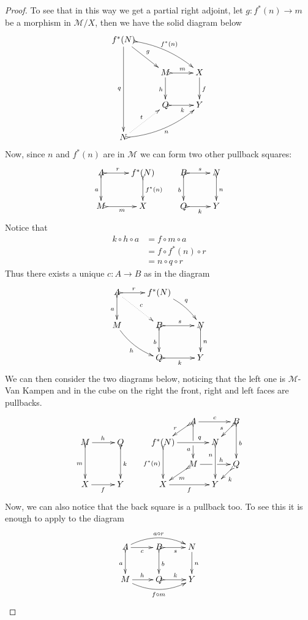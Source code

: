 \begin{proof}
To see that in this way we get a partial right adjoint, let $g\colon f^*(n)\to m $ be a morphism in $\mathcal{M}/X$, then we have the solid diagram below
\[\xymatrix{f^*(N) \ar[dr]^{g} \ar@{>->}@/^.3cm/[drr]^{f^*(n)} \ar[ddd]_{q}\\& M \ar@{>->}[r]^{m}\ar[d]_{h}& X \ar[d]^f \\&Q\ar@{>->}[r]_{k}&Y\\N \ar@{>->}@/_.3cm/[urr]_{n} \ar@{.>}[ur]^{t}}\]
Now, since $n$ and $f^*(n)$ are in $\mathcal{M}$ we can form two other pullback squares:
\[\xymatrix{A \ar@{>->}[d]_{a}\ar@{>->}[r]^-{r}& f^*(N) \ar@{>->}[d]^{f^*(n)} & B \ar@{>->}[r]^{s} \ar@{>->}[d]_{b}& N \ar@{>->}[d]^{n}\\M \ar@{>->}[r]_{m}&X &Q \ar@{>->}[r]_k&Y\\}\]
Notice that 
\begin{align*}
	k\circ h\circ a&=f\circ m\circ a\\&=f\circ f^*(n)\circ r\\&=n\circ q \circ r
\end{align*}
Thus there exists a unique $c\colon A\to B$ as in the diagram
\[\xymatrix{A \ar@{>->}[d]_{a} \ar@{.>}[dr]^{c}\ar@{>->}[r]^-{r} &f^*(N) \ar@/^.2cm/[dr]^{q} \\ M \ar@/_.2cm/[dr]_{h}&B\ar@{>->}[r]^{s}  \ar@{>->}[d]_{b}& N \ar@{>->}[d]^{n}\\ &Q \ar@{>->}[r]_{k} & Y}\]
We can then consider the two diagrams below, noticing that the left one is $\mathcal{M}$-Van Kampen and in the cube on the right the front, right and left faces are pullbacks.
		\[\xymatrix@C=10pt@R=10pt{&&&&&A\ar@{>->}[dd]|\hole_(.65){a}\ar[rr]^{c} \ar@{>->}[dl]_{r} && B \ar@{>->}[dd]^{b} \ar@{>->}[dl]_{s} \\ M \ar@{>->}[dd]_{m}\ar[rr]^{h}&&Q\ar@{>->}[dd]^{k}&&f^*(N)  \ar@{>->}[dd]_{f^*(n)}\ar[rr]^(.7){q} & & N \ar@{>->}[dd]_(.3){n}\\&&&&&M\ar[rr]|\hole^(.65){h} \ar@{>->}[dl]^{m} && Q \ar@{>->}[dl]^{k} \\X\ar[rr]_{f} &&Y&&X \ar[rr]_{f} & & Y}\]
Now, we can also notice that the back square is a pullback too. To see this it is enough to apply  to the diagram
\[\xymatrix{A  \ar@/^.4cm/[rr]^{a\circ r}\ar@{>->}[d]_{a} \ar[r]_{c}& \ar@{>->}[r]_{s}B \ar@{>->}[d]^{b}& N \ar[d]^{n}\\ M \ar@/_.4cm/[rr]_{f\circ m}\ar[r]^{h}& Q \ar@{>->}[r]^{k}& Y}\]


\end{proof}
